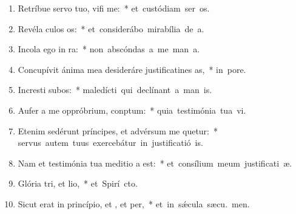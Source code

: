 \begin{flushleft}
\begin{enumerate}[leftmargin=*]

\item Retríbue servo tuo, vifi me:~* \mbox{et custódiam ser os.}
\item Revéla culos os:~* \mbox{et considerábo mirabília de  a.}
\item Incola ego  in ra:~* \mbox{non abscóndas a me man a.}
\item Concupívit ánima mea desideráre justificatines as,~* \mbox{in  pore.}
\item Incresti subos:~* \mbox{maledícti qui declínant a man is.}
\item Aufer a me oppróbrium,  conptum:~* \mbox{quia testimónia tua vi.}
\item Etenim sedérunt príncipes, et advérsum me quetur:~* \mbox{servus autem tuus exercebátur in justificatió is.}
\item Nam et testimónia tua meditio a est:~* \mbox{et consílium meum justificati æ.}
\item Glória tri, et lio,~* \mbox{et Spirí cto.}
\item Sicut erat in princípio, et , et per,~* \mbox{et in s\'{\ae}cula sæcu. men.}


\end{enumerate}
\end{flushleft}

